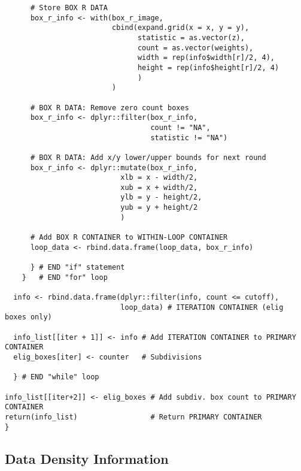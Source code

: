 \begin{verbatim}
      # Store BOX R DATA
      box_r_info <- with(box_r_image,
                         cbind(expand.grid(x = x, y = y),
                               statistic = as.vector(z),
                               count = as.vector(weights),
                               width = rep(info$width[r]/2, 4),
                               height = rep(info$height[r]/2, 4)
                               )
                         )

      # BOX R DATA: Remove zero count boxes
      box_r_info <- dplyr::filter(box_r_info,
                                  count != "NA",
                                  statistic != "NA")

      # BOX R DATA: Add x/y lower/upper bounds for next round
      box_r_info <- dplyr::mutate(box_r_info,
                           xlb = x - width/2,
                           xub = x + width/2,
                           ylb = y - height/2,
                           yub = y + height/2
                           )

      # Add BOX R CONTAINER to WITHIN-LOOP CONTAINER
      loop_data <- rbind.data.frame(loop_data, box_r_info) 

      } # END "if" statement
    }   # END "for" loop

  info <- rbind.data.frame(dplyr::filter(info, count <= cutoff),
                           loop_data) # ITERATION CONTAINER (elig boxes only)

  info_list[[iter + 1]] <- info # Add ITERATION CONTAINER to PRIMARY CONTAINER
  elig_boxes[iter] <- counter   # Subdivisions

  } # END "while" loop

info_list[[iter+2]] <- elig_boxes # Add subdiv. box count to PRIMARY CONTAINER
return(info_list)                 # Return PRIMARY CONTAINER
}

\end{verbatim}
      	
\subsection{Data Density Information}

